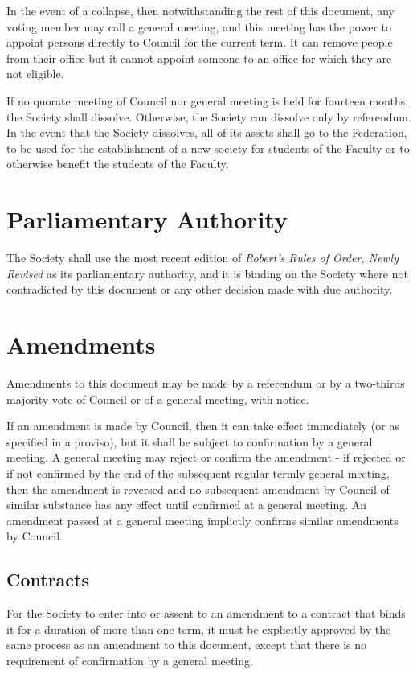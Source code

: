 In the event of a collapse, then notwithstanding the rest of this document, any
voting member may call a general meeting, and this meeting has the power to
appoint persons directly to Council for the current term. It can remove people
from their office but it cannot appoint someone to an office for which they are
not eligible.

If no quorate meeting of Council nor general meeting is held for fourteen months, the
Society shall dissolve. Otherwise, the Society can dissolve only by referendum.
In the event that the Society dissolves, all of its assets shall go to the
Federation, to be used for the establishment of a new society for students of
the Faculty or to otherwise benefit the students of the Faculty.

\section{Parliamentary Authority}
The Society shall use the most recent edition of
\emph{Robert's Rules of Order, Newly Revised} as its parliamentary authority,
and it is binding on the Society where not contradicted by this document or any
other decision made with due authority.

\section{Amendments}
Amendments to this document may be made by a referendum or by a two-thirds
majority vote of Council or of a general meeting, with notice.

If an amendment is made by Council, then it can take effect immediately (or as
specified in a proviso), but it shall be subject to confirmation by a general
meeting. A general meeting may reject or confirm the amendment - if rejected
or if not confirmed by the end of the subsequent regular termly general meeting,
then the amendment is reversed and no subsequent amendment by Council of similar
substance has any effect until confirmed at a general meeting. An amendment
passed at a general meeting implictly confirms similar amendments by Council.

\subsection{Contracts}
For the Society to enter into or assent to an amendment to a contract
that binds it for a duration of more than one term, it must be explicitly
approved by the same process as an amendment to this document, except that there
is no requirement of confirmation by a general meeting.

